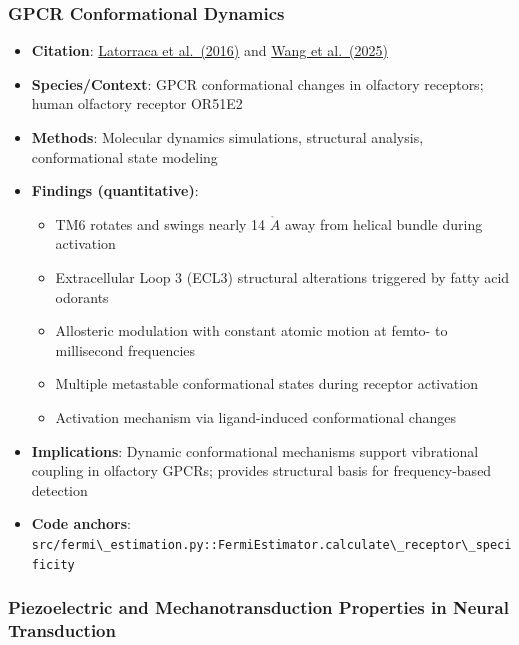 \documentclass[
  13pt,
  a4paperpaper,
  12pt]{article}
\newcommand{\passthrough}[1]{#1}
\providecommand{\tightlist}{%
  \setlength{\itemsep}{0pt}\setlength{\parskip}{0pt}}
\begin{document}
\subsubsection{GPCR Conformational
Dynamics}\label{gpcr-conformational-dynamics}

\begin{itemize}
\tightlist
\item
  \textbf{Citation}:
  \href{https://pubs.acs.org/doi/10.1021/acs.chemrev.6b00177}{Latorraca
  et al.~(2016)} and
  \href{https://pmc.ncbi.nlm.nih.gov/articles/PMC11751049/}{Wang et
  al.~(2025)}
\item
  \textbf{Species/Context}: GPCR conformational changes in olfactory
  receptors; human olfactory receptor OR51E2
\item
  \textbf{Methods}: Molecular dynamics simulations, structural analysis,
  conformational state modeling
\item
  \textbf{Findings (quantitative)}:

  \begin{itemize}
  \tightlist
  \item
    TM6 rotates and swings nearly 14 \(\mathring{A}\) away from helical
    bundle during activation
  \item
    Extracellular Loop 3 (ECL3) structural alterations triggered by
    fatty acid odorants
  \item
    Allosteric modulation with constant atomic motion at femto- to
    millisecond frequencies
  \item
    Multiple metastable conformational states during receptor activation
  \item
    Activation mechanism via ligand-induced conformational changes
  \end{itemize}
\item
  \textbf{Implications}: Dynamic conformational mechanisms support
  vibrational coupling in olfactory GPCRs; provides structural basis for
  frequency-based detection
\item
  \textbf{Code anchors}:
  \passthrough{\lstinline!src/fermi\_estimation.py::FermiEstimator.calculate\_receptor\_specificity!}
\end{itemize}

\subsubsection{Piezoelectric and Mechanotransduction Properties in
Neural
Transduction}\label{piezoelectric-and-mechanotransduction-properties-in-neural-transduction}
\end{document}
